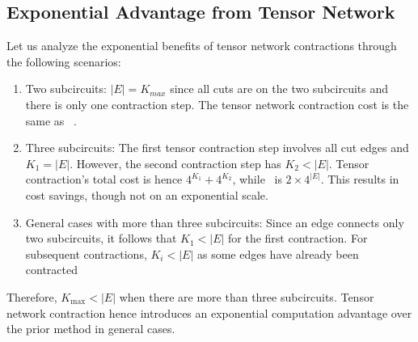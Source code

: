 \subsection{Exponential Advantage from Tensor Network}
Let us analyze the exponential benefits of tensor network contractions through the following scenarios:
\begin{enumerate}
    \item Two subcircuits: $|E|=K_{max}$ since all cuts are on the two subcircuits and there is only one contraction step.
    The tensor network contraction cost is the same as ~\cite{tang2021cutqc}.
    \item Three subcircuits: The first tensor contraction step involves all cut edges and $K_1=|E|$.
    However, the second contraction step has $K_2<|E|$.
    Tensor contraction's total cost is hence $4^{K_1}+4^{K_2}$,
    while~\cite{tang2021cutqc} is $2\times4^{|E|}$.
    This results in cost savings, though not on an exponential scale.
    \item General cases with more than three subcircuits:
    Since an edge connects only two subcircuits,
    it follows that $K_1<|E|$ for the first contraction.
    For subsequent contractions, $K_i<|E|$ as some edges have already been contracted
\end{enumerate}
Therefore, $K_{\max}<|E|$ when there are more than three subcircuits.
Tensor network contraction hence introduces an exponential computation advantage over the prior method in general cases.